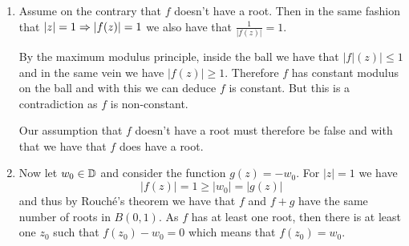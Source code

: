 \documentclass[12pt]{memoir}
\begin{document}
\begin{ptcbr}
    \begin{enumerate}
        \item Assume on the contrary that $f$ doesn't have a root. Then in the same fashion that $|z|=1\Rightarrow|f(z)|=1$ we also have that $\frac{1}{|f(z)|}=1$.\par 
        By the maximum modulus principle, inside the ball we have that $|f|(z)|\leq 1$ and in the same vein we have $|f(z)|\geq 1$. Therefore $f$ has constant modulus on the ball and with this we can deduce $f$ is constant. But this is a contradiction as $f$ is non-constant.\par 
        Our assumption that $f$ doesn't have a root must therefore be false and with that we have that $f$ does have a root.
        \item Now let $w_0\in\mathbb{D}$ and consider the function $g(z)=-w_0$. For $|z|=1$ we have 
        $$|f(z)|=1\geq |w_0|=|g(z)|$$
        and thus by Rouché's theorem we have that $f$ and $f+g$ have the same number of roots in $B(0,1)$. As $f$ has at least one root, then there is at least one $z_0$ such that $f(z_0)-w_0=0$ which means that $f(z_0)=w_0$.
    \end{enumerate}
\end{ptcbr}
\end{document}
